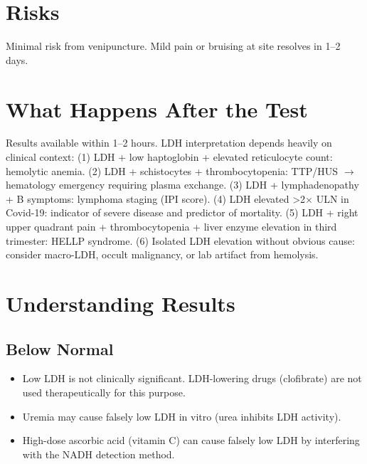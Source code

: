 \section*{Risks}
Minimal risk from venipuncture. Mild pain or bruising at site resolves in 1--2 days.

\section*{What Happens After the Test}
Results available within 1--2 hours. LDH interpretation depends heavily on clinical context: (1) LDH + low haptoglobin + elevated reticulocyte count: hemolytic anemia. (2) LDH + schistocytes + thrombocytopenia: TTP/HUS $\rightarrow$ hematology emergency requiring plasma exchange. (3) LDH + lymphadenopathy + B symptoms: lymphoma staging (IPI score). (4) LDH elevated >2$\times$ ULN in Covid-19: indicator of severe disease and predictor of mortality. (5) LDH + right upper quadrant pain + thrombocytopenia + liver enzyme elevation in third trimester: HELLP syndrome. (6) Isolated LDH elevation without obvious cause: consider macro-LDH, occult malignancy, or lab artifact from hemolysis.

\section*{Understanding Results}

\subsection*{Below Normal}
\begin{itemize}
  \item Low LDH is not clinically significant. LDH-lowering drugs (clofibrate) are not used therapeutically for this purpose.
  \item Uremia may cause falsely low LDH in vitro (urea inhibits LDH activity).
  \item High-dose ascorbic acid (vitamin C) can cause falsely low LDH by interfering with the NADH detection method.
\end{itemize}


